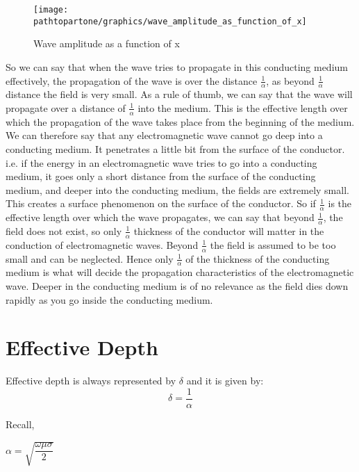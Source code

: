 \begin{figure}[h]
\centering
\texttt{[image: \\pathtopartone/graphics/wave\_amplitude\_as\_function\_of\_x]}
\caption{Wave amplitude as a function of x}
\label{fig:bello261}
\end{figure}

So we can say that when the wave tries to propagate in this conducting medium effectively, the propagation of the wave is over the distance $\frac{1}{\alpha}$, as beyond $\frac{1}{\alpha}$ distance the field is very small. As a rule of thumb, we can say that the wave will propagate over a distance of $\frac{1}{\alpha}$ into the medium. This is the effective length over which the propagation of the wave takes place from the beginning of the medium. We can therefore say that any electromagnetic wave cannot go deep into a conducting medium. It penetrates a little bit from the surface of the conductor. i.e. if the energy in an electromagnetic wave tries to go into a conducting medium, it goes only a short distance from the surface of the conducting medium, and deeper into the conducting medium, the fields are extremely small. This creates a surface phenomenon on the surface of the conductor. So if $\frac{1}{\alpha}$  is the effective length over which the wave propagates, we can say that beyond $\frac{1}{\alpha}$, the field does not exist, so only $\frac{1}{\alpha}$ thickness of the conductor will matter in the conduction of electromagnetic waves. Beyond $\frac{1}{\alpha}$  the field is assumed to be too small and can be neglected. Hence only $\frac{1}{\alpha}$ of the thickness of the conducting medium is what will decide the propagation characteristics of the electromagnetic wave. Deeper in the conducting medium is of no relevance as the field dies down rapidly as you go inside the conducting medium.

\section{\textbf{Effective Depth}}

Effective depth is always represented by $\delta$ and it is given by:
\[
\delta=\frac{1}{\alpha}
\]
\begin{equation}\end{equation}

Recall,
\begin{center}
$\alpha=\sqrt{\dfrac{\omega\mu\sigma}{2}}$
\end{center}
\begin{equation}\end{equation}


